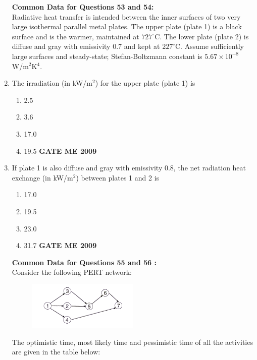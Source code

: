 \documentclass[journal]{IEEEtran}
\begin{document}
\begin{enumerate}[leftmargin=0pt]
\textbf{Common Data for Questions 53 and 54:}\\
Radiative heat transfer is intended between the inner surfaces of two very large isothermal parallel metal plates. The upper plate (plate 1) is a black surface and is the warmer, maintained at $727^{\circ}$C. The lower plate (plate 2) is diffuse and gray with emissivity 0.7 and kept at $227^{\circ}$C. Assume sufficiently large surfaces and steady-state; Stefan-Boltzmann constant is $5.67 \times 10^{-8}$ W/m$^2$K$^4$.
\item The irradiation (in kW/m$^2$) for the upper plate (plate 1) is
\begin{enumerate}[label=(\Alph*)]
  \item 2.5
  \item 3.6
  \item 17.0
  \item 19.5
\hfill{\textbf{GATE ME 2009}}
\end{enumerate}
\item If plate 1 is also diffuse and gray with emissivity 0.8, the net radiation heat exchange (in kW/m$^2$) between plates 1 and 2 is
\begin{enumerate}[label=(\Alph*)]
  \item 17.0
  \item 19.5
  \item 23.0
  \item 31.7
\hfill{\textbf{GATE ME 2009}}
\end{enumerate}
\textbf{Common Data for Questions 55 and 56 :}\\
Consider the following PERT network:
\begin{figure}[h]
  \centering
  \includegraphics[width=0.5\textwidth]{Figs/image (12).png}
\end{figure}
The optimistic time, most likely time and pessimistic time of all the activities are given in the table below:\\
\begin{table}[h]
    \centering
    
   
\end{table}



\end{enumerate}
\end{document}
